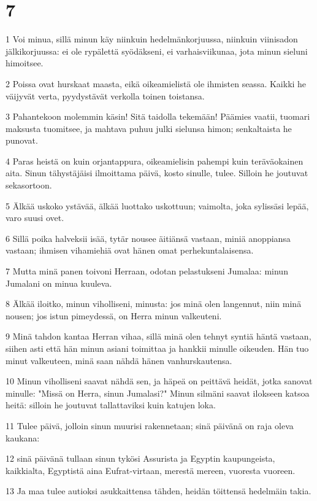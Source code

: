 \chapter{7}

\par 1 Voi minua, sillä minun käy niinkuin hedelmänkorjuussa, niinkuin viinisadon jälkikorjuussa: ei ole rypälettä syödäkseni, ei varhaisviikunaa, jota minun sieluni himoitsee.
\par 2 Poissa ovat hurskaat maasta, eikä oikeamielistä ole ihmisten seassa. Kaikki he väijyvät verta, pyydystävät verkolla toinen toistansa.
\par 3 Pahantekoon molemmin käsin! Sitä taidolla tekemään! Päämies vaatii, tuomari maksusta tuomitsee, ja mahtava puhuu julki sielunsa himon; senkaltaista he punovat.
\par 4 Paras heistä on kuin orjantappura, oikeamielisin pahempi kuin teräväokainen aita. Sinun tähystäjäisi ilmoittama päivä, kosto sinulle, tulee. Silloin he joutuvat sekasortoon.
\par 5 Älkää uskoko ystävää, älkää luottako uskottuun; vaimolta, joka sylissäsi lepää, varo suusi ovet.
\par 6 Sillä poika halveksii isää, tytär nousee äitiänsä vastaan, miniä anoppiansa vastaan; ihmisen vihamiehiä ovat hänen omat perhekuntalaisensa.
\par 7 Mutta minä panen toivoni Herraan, odotan pelastukseni Jumalaa: minun Jumalani on minua kuuleva.
\par 8 Älkää iloitko, minun viholliseni, minusta: jos minä olen langennut, niin minä nousen; jos istun pimeydessä, on Herra minun valkeuteni.
\par 9 Minä tahdon kantaa Herran vihaa, sillä minä olen tehnyt syntiä häntä vastaan, siihen asti että hän minun asiani toimittaa ja hankkii minulle oikeuden. Hän tuo minut valkeuteen, minä saan nähdä hänen vanhurskautensa.
\par 10 Minun viholliseni saavat nähdä sen, ja häpeä on peittävä heidät, jotka sanovat minulle: "Missä on Herra, sinun Jumalasi?" Minun silmäni saavat ilokseen katsoa heitä: silloin he joutuvat tallattaviksi kuin katujen loka.
\par 11 Tulee päivä, jolloin sinun muurisi rakennetaan; sinä päivänä on raja oleva kaukana:
\par 12 sinä päivänä tullaan sinun tykösi Assurista ja Egyptin kaupungeista, kaikkialta, Egyptistä aina Eufrat-virtaan, merestä mereen, vuoresta vuoreen.
\par 13 Ja maa tulee autioksi asukkaittensa tähden, heidän töittensä hedelmäin takia.
